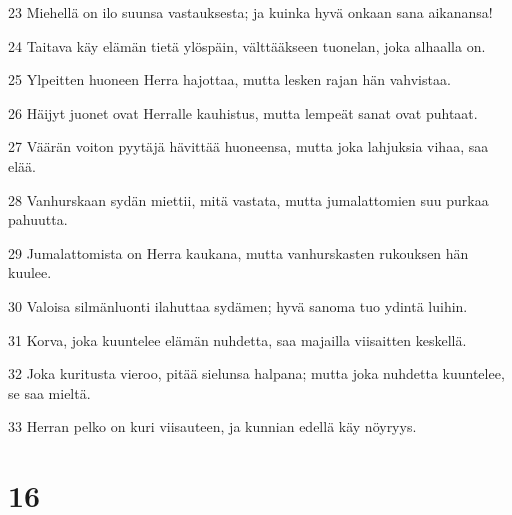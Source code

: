 \par 23 Miehellä on ilo suunsa vastauksesta; ja kuinka hyvä onkaan sana aikanansa!
\par 24 Taitava käy elämän tietä ylöspäin, välttääkseen tuonelan, joka alhaalla on.
\par 25 Ylpeitten huoneen Herra hajottaa, mutta lesken rajan hän vahvistaa.
\par 26 Häijyt juonet ovat Herralle kauhistus, mutta lempeät sanat ovat puhtaat.
\par 27 Väärän voiton pyytäjä hävittää huoneensa, mutta joka lahjuksia vihaa, saa elää.
\par 28 Vanhurskaan sydän miettii, mitä vastata, mutta jumalattomien suu purkaa pahuutta.
\par 29 Jumalattomista on Herra kaukana, mutta vanhurskasten rukouksen hän kuulee.
\par 30 Valoisa silmänluonti ilahuttaa sydämen; hyvä sanoma tuo ydintä luihin.
\par 31 Korva, joka kuuntelee elämän nuhdetta, saa majailla viisaitten keskellä.
\par 32 Joka kuritusta vieroo, pitää sielunsa halpana; mutta joka nuhdetta kuuntelee, se saa mieltä.
\par 33 Herran pelko on kuri viisauteen, ja kunnian edellä käy nöyryys.

\chapter{16}

